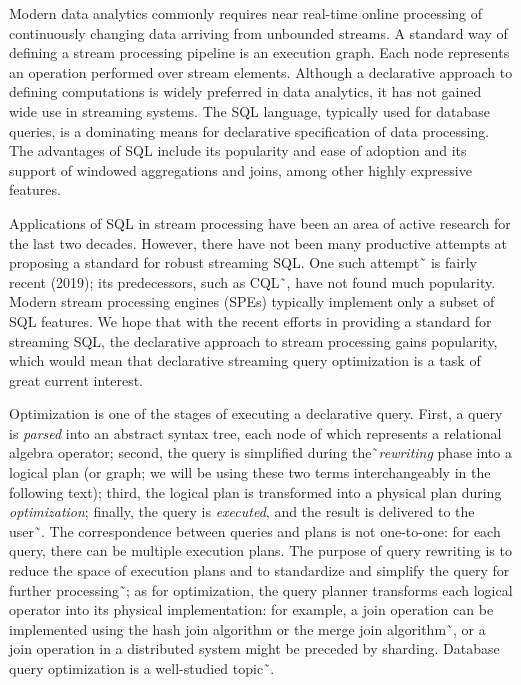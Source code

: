 \label {fs-optimization-introduction}

Modern data analytics commonly requires near real-time online processing of continuously changing data arriving from unbounded streams. 
A standard way of defining a stream processing pipeline is an execution graph. Each node represents an operation performed over stream elements. 
Although a declarative approach to defining computations is widely preferred in data analytics,  it has not gained wide use in streaming systems. 
The SQL language, typically used for database queries, is a dominating means for declarative specification of data processing. 
The advantages of SQL include its popularity and ease of adoption and its support of windowed aggregations and joins, among other highly expressive features. 

Applications of SQL in stream processing have been an area of active research for the last two decades. 
However, there have not been many productive attempts at proposing a standard for robust streaming SQL. 
One such attempt˜\cite{Begoli:2019:OSR:3299869.3314040} is fairly recent (2019); its predecessors, such as CQL˜\cite{Arasu:2006:CCQ:1146461.1146463}, have not found much popularity.
 Modern stream processing engines (SPEs) typically implement only a subset of SQL features. We hope that with the recent efforts in providing a standard for streaming SQL, the declarative approach to stream processing gains popularity, which would mean that declarative streaming query optimization is a task of great current interest.

Optimization is one of the stages of executing a declarative query. 
First, a query is \textit{parsed} into an abstract syntax tree, each node of which represents a relational algebra operator; second, the query is simplified during the˜\textit{rewriting} phase into a logical plan (or graph; we will be using these two terms interchangeably in the following text); third, the logical plan is transformed into a physical plan during \textit{optimization}; finally, the query is \textit{executed}, and the result is delivered to the user˜\cite{Pitoura2018processing}. 
The correspondence between queries and plans is not one-to-one: for each query, there can be multiple execution plans. 
The purpose of query rewriting is to reduce the space of execution plans and to standardize and simplify the query for further processing˜\cite{Pitoura2018rewriting}; as for optimization, the query planner transforms each logical operator into its physical implementation: for example, a join operation can be implemented using the hash join algorithm or the merge join algorithm˜\cite{Neumann2018optimization}, or a join operation in a distributed system might be preceded by sharding.  
Database query optimization is a well-studied topic˜\cite{astrahan1976system, haas1989extensible, graefe1993volcano}. 

